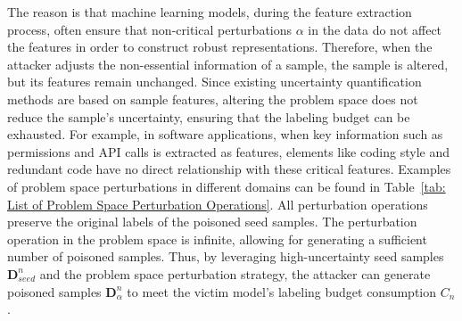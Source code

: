 The reason is that machine learning models, during the feature extraction process, often ensure that non-critical perturbations $\alpha$ in the data do not affect the features in order to construct robust representations.
Therefore, when the attacker adjusts the non-essential information of a sample, the sample is altered, but its features remain unchanged.
Since existing uncertainty quantification methods are based on sample features, altering the problem space does not reduce the sample's uncertainty, ensuring that the labeling budget can be exhausted.
For example, in software applications, when key information such as permissions and API calls is extracted as features, elements like coding style and redundant code have no direct relationship with these critical features.
Examples of problem space perturbations in different domains can be found in Table~\ref{tab: List of Problem Space Perturbation Operations}.
All perturbation operations preserve the original labels of the poisoned seed samples.
The perturbation operation in the problem space is infinite, allowing for generating a sufficient number of poisoned samples.
Thus, by leveraging high-uncertainty seed samples $\bm{D}_{seed}^{n}$ and the problem space perturbation strategy, the attacker can generate poisoned samples $\bm{D}_{\alpha}^{n}$ to meet the victim model's labeling budget consumption $C_{n}$.

